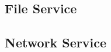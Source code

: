 

\subsection{File Service}
\label{sub:file_service}

\subsection{Network Service}
\label{sub:network_service}
